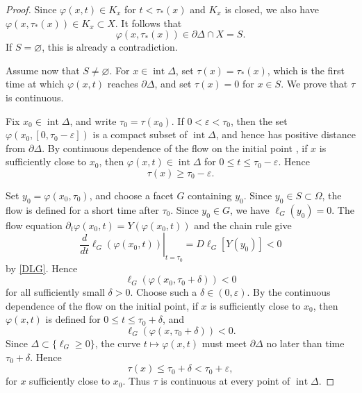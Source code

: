 \documentclass[12pt,reqno]{amsart}
\numberwithin{equation}{section}
\theoremstyle{remark}
\begin{document}
\begin{proof}
	
	Since \(\varphi(x,t)\in K_x\) for \(t<\tau_*(x)\) and \(K_x\) is
	closed, we also have
	\(
	\varphi(x,\tau_*(x))\in K_x\subset X
	\).
	It follows that
	\begin{equation}\label{taus}
	\varphi(x,\tau_*(x))\in
	\partial\Delta\cap X=S.
	\end{equation}
	If \(S=\varnothing\), this is already a contradiction.
	
	
Assume now that \(S\neq\varnothing\). For
\(x\in\operatorname{int}\Delta\), set
\(\tau(x)=\tau_*(x)\), which is the first time at which
\(\varphi(x,t)\) reaches \(\partial\Delta\), and set
\(\tau(x)=0\) for \(x\in S\). We prove that \(\tau\) is continuous.
	

	
Fix \(x_0\in\operatorname{int}\Delta\), and write
\(\tau_0=\tau(x_0)\). If \(0<\varepsilon<\tau_0\), then the set
\(\varphi(x_0,[0,\tau_0-\varepsilon])\) is a compact subset of
\(\operatorname{int}\Delta\), and hence has positive distance from
\(\partial\Delta\). By continuous dependence of the flow on the initial point
\cite[Theorem~6.1]{TeschlODE}, if \(x\) is sufficiently close to
\(x_0\), then \(\varphi(x,t)\in\operatorname{int}\Delta\) for
\(0\leq t\leq\tau_0-\varepsilon\). Hence
\[
\tau(x)\geq\tau_0-\varepsilon.
\]


	
	Set \(y_0=\varphi(x_0,\tau_0)\), and choose a facet \(G\)
	containing \(y_0\). Since \(y_0\in S\subset\Omega\), the flow is defined for a short
	time after \(\tau_0\). Since \(y_0\in G\), we have \(\ell_G(y_0)=0\).
	The flow equation
	\(\partial_t\varphi(x_0,t)=Y(\varphi(x_0,t))\)
	and the chain rule give
	\[
	\left.\frac{d}{dt}\ell_G(\varphi(x_0,t))\right|_{t=\tau_0}
	=
	D\ell_G[Y(y_0)]<0
	\]
	by \eqref{DLG}. Hence
	\[
	\ell_G(\varphi(x_0,\tau_0+\delta))<0
	\]
	for all sufficiently small \(\delta>0\).  Choose such a
	\(\delta\in(0,\varepsilon)\). By the continuous dependence of the flow on the initial
	point, if \(x\) is sufficiently close
	to \(x_0\), then \(\varphi(x,t)\) is defined for
	\(0\leq t\leq\tau_0+\delta\), and
	\[
	\ell_G(\varphi(x,\tau_0+\delta))<0.
	\]
Since \(\Delta\subset\{\ell_G\geq0\}\), the curve
\(t\mapsto\varphi(x,t)\) must meet \(\partial\Delta\) no later than
time \(\tau_0+\delta\). Hence
\[
\tau(x)\leq\tau_0+\delta<\tau_0+\varepsilon,
\]
for \(x\) sufficiently close to \(x_0\). Thus \(\tau\) is
continuous at every point of \(\operatorname{int}\Delta\).
	

\end{proof}
\end{document}
